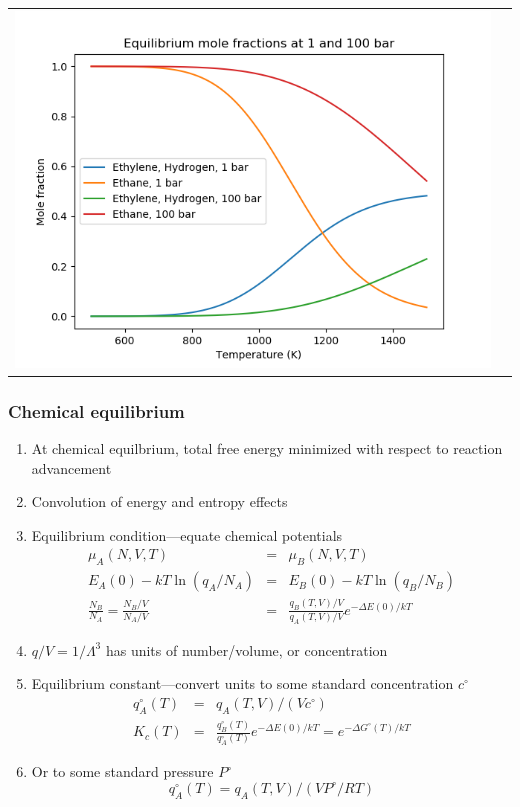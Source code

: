 \documentclass[11pt]{article}
\begin{document}
\begin{table}
\begin{tabular}{cc}
\includegraphics[scale=0.5]{./Images/equilibrium.png} 
\end{tabular}
\end{table}

\subsubsection{Chemical equilibrium}
\label{sec:org72b5010}
\begin{enumerate}
\item At chemical equilbrium, total free energy minimized with respect to reaction advancement
\item Convolution of energy and entropy effects
\item Equilibrium condition---equate chemical potentials
  \begin{eqnarray*}
 \mu_A(N,V,T) & = & \mu_B(N,V,T) \\
 E_A(0) - k T \ln (q_A/N_A) & = & E_B(0) - k T \ln (q_B/N_B) \\
\frac{N_B}{N_A} =  \frac{N_B/V}{N_A/V} & = &\frac{q_B(T,V)/V}{q_A(T,V)/V} e^{-\Delta E(0)/kT}
  \end{eqnarray*}
\item \(q/V = 1/\Lambda^3\) has units of number/volume, or concentration
\item Equilibrium constant---convert units to some standard concentration \(c^\circ\)
 \begin{eqnarray*}
  q_A^\circ(T) & = & q_A(T,V)/(V c^\circ) \\
K_c(T) & = &\frac{q_B^\circ(T)}{q_A^\circ(T)} e^{-\Delta E(0)/kT} = e^{-\Delta G^\circ(T)/kT}
 \end{eqnarray*}
\item Or to some standard pressure \(P^\circ\)
\[q_A^\circ(T) = q_A(T,V)/(V P^\circ/RT) \]
\end{enumerate}
\end{document}
